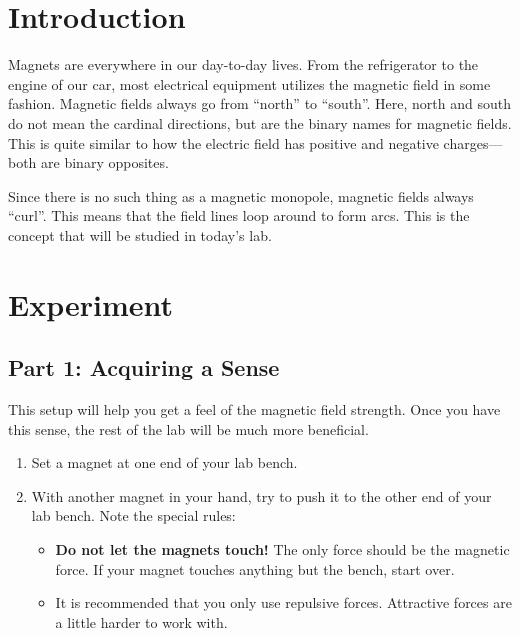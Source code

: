 \documentclass[12pt]{article}
\begin{document}
\section*{Introduction}
Magnets are everywhere in our day-to-day lives. From the refrigerator to the engine of our car, most electrical equipment utilizes the magnetic field in some fashion. Magnetic fields always go from ``north'' to ``south''. Here, north and south do not mean the cardinal directions, but are the binary names for magnetic fields. This is quite similar to how the electric field has positive and negative charges---both are binary opposites.

Since there is no such thing as a magnetic monopole, magnetic fields always ``curl''. This means that the field lines loop around to form arcs. This is the concept that will be studied in today's lab.

\section*{Experiment}
\subsection*{Part 1: Acquiring a Sense}
This setup will help you get a feel of the magnetic field strength. Once you have this sense, the rest of the lab will be much more beneficial.
\begin{enumerate}
	\item{Set a magnet at one end of your lab bench.}
	\item{With another magnet in your hand, try to push it to the other end of your lab bench. Note the special rules:}
	\begin{itemize}
		\item{\textbf{Do not let the magnets touch!} The only force should be the magnetic force. If your magnet touches anything but the bench, start over.}
		\item{It is recommended that you only use repulsive forces. Attractive forces are a little harder to work with.}
	\end{itemize}
\end{enumerate}
\end{document}
